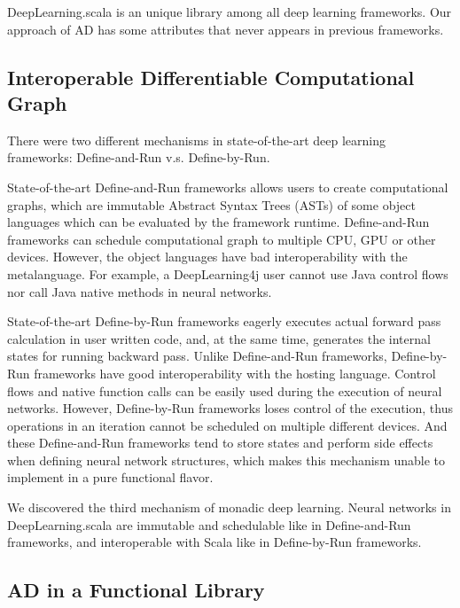 DeepLearning.scala is an unique library among all deep learning frameworks. Our approach of AD has some attributes that never appears in previous frameworks.

\subsection{Interoperable Differentiable Computational Graph}

There were two different mechanisms in state-of-the-art deep learning frameworks:
Define-and-Run v.s. Define-by-Run.

State-of-the-art Define-and-Run frameworks \cite{collobert2008torch,bergstra2010theano,jia2014caffe,chen2015mxnet,abadi2016tensorflow,intel2016bigdl,skymind2017deeplearning4j} allows users to create \glspl{computational graph}, which are immutable Abstract Syntax Trees (ASTs) of some object languages which can be evaluated by the framework runtime. Define-and-Run frameworks can schedule \gls{computational graph} to multiple CPU, GPU or other devices. However, the object languages have bad interoperability with the metalanguage. For example, a DeepLearning4j user cannot use Java control flows nor call Java native methods in neural networks.

State-of-the-art Define-by-Run frameworks \cite{tokui2015chainer,neubig2017dynet,google2017eager,paszke2017pytorch} eagerly executes actual forward pass calculation in user written code, and, at the same time, generates the internal states for running backward pass. Unlike Define-and-Run frameworks, Define-by-Run frameworks have good interoperability with the hosting language. Control flows and native function calls can be easily used during the execution of neural networks. However, Define-by-Run frameworks loses control of the execution, thus operations in an iteration cannot be scheduled on multiple different devices. And these Define-and-Run frameworks tend to store states and perform side effects when defining neural network structures, which makes this mechanism unable to implement in a pure functional flavor.

We discovered the third mechanism of monadic deep learning. Neural networks in DeepLearning.scala are immutable and schedulable like in Define-and-Run frameworks, and interoperable with Scala like in Define-by-Run frameworks.

\subsection{AD in a Functional Library}

